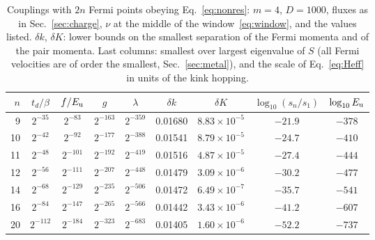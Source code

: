 \documentclass[11pt]{article}
\newcommand{\Eu}{E_{\rm u}}
\begin{document}
\begin{table}[t]
\centering
\caption{\label{tab:cases}Couplings with $2n$ Fermi points obeying Eq.~\eqref{eq:nonres}: $m=4$, $D=1000$, fluxes as in Sec.~\ref{sec:charge}, $\nu$ at the middle of the window~\eqref{eq:window}, and the values listed. $\delta k$, $\delta K$: lower bounds on the smallest separation of the Fermi momenta and of the pair momenta. Last columns: smallest over largest eigenvalue of $S$ (all Fermi velocities are of order the smallest, Sec.~\ref{sec:metal}), and the scale of Eq.~\eqref{eq:Heff} in units of the kink hopping.}
\smallskip
\small
\begin{tabular}{rcccccccc}
\toprule
$n$ & $t_d/\beta$ & $f/\Eu$ & $g$ & $\lambda$ & $\delta k$ & $\delta K$ & $\log_{10}(s_n/s_1)$ & $\log_{10}\Eu$\\
\midrule
9 & $2^{-35}$ & $2^{-83}$ & $2^{-163}$ & $2^{-359}$ & 0.01680 & $8.83\times10^{-5}$ & $-21.9$ & $-378$\\
10 & $2^{-42}$ & $2^{-92}$ & $2^{-177}$ & $2^{-388}$ & 0.01541 & $8.79\times10^{-5}$ & $-24.7$ & $-410$\\
11 & $2^{-48}$ & $2^{-101}$ & $2^{-192}$ & $2^{-419}$ & 0.01516 & $4.87\times10^{-5}$ & $-27.4$ & $-444$\\
12 & $2^{-56}$ & $2^{-111}$ & $2^{-207}$ & $2^{-448}$ & 0.01479 & $3.09\times10^{-6}$ & $-30.2$ & $-477$\\
14 & $2^{-68}$ & $2^{-129}$ & $2^{-235}$ & $2^{-506}$ & 0.01472 & $6.49\times10^{-7}$ & $-35.7$ & $-541$\\
16 & $2^{-84}$ & $2^{-147}$ & $2^{-265}$ & $2^{-566}$ & 0.01442 & $3.43\times10^{-6}$ & $-41.2$ & $-607$\\
20 & $2^{-112}$ & $2^{-184}$ & $2^{-323}$ & $2^{-683}$ & 0.01405 & $1.60\times10^{-6}$ & $-52.2$ & $-737$\\
\bottomrule
\end{tabular}
\end{table}
\end{document}

